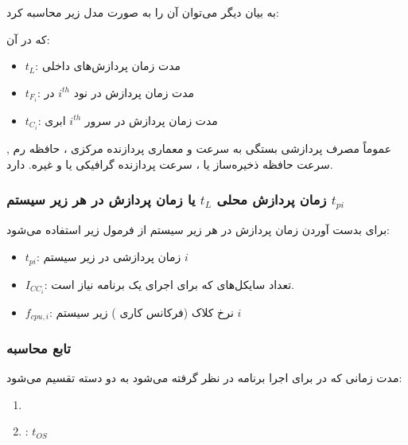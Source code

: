 به بیان دیگر می‌توان آن را به صورت مدل زیر محاسبه کرد:


که در آن:

\begin{itemize}
    \item $t_L$: مدت زمان پردازش‌های داخلی
    \item $t_{F_i}$: مدت زمان پردازش در نود $i^{th}$ در 
    \item $t_{C_i}$: مدت زمان پردازش در سرور $i^{th}$ ابری
\end{itemize}

عموماً مصرف پردازشی بستگی به سرعت و معماری پردازنده مرکزی ، حافظه رم
, سرعت حافظه ذخیره‌ساز  یا ، سرعت پردازنده گرافیکی
یا  و غیره. دارد.

\subsubsection{زمان پردازش محلی $t_L$ یا زمان پردازش در هر زیر سیستم $t_{pi}$}

برای بدست آوردن زمان پردازش در هر زیر سیستم از فرمول زیر استفاده می‌شود:


\begin{itemize}
    \item $t_{pi}$: زمان پردازشی در زیر سیستم $i$
    \item $I_{CC_i}$: تعداد سایکل‌های  که برای اجرای یک برنامه نیاز است.
    \item $f_{cpu, i}$: نرخ کلاک (فرکانس کاری ) زیر سیستم $i$
\end{itemize}


\subsubsection{تابع محاسبه }

مدت زمانی که در  برای اجرا برنامه در نظر گرفته می‌شود به دو دسته تقسیم می‌شود:

\begin{enumerate}
    \item {}
    \item {}: $t_{OS}$
\end{enumerate}

